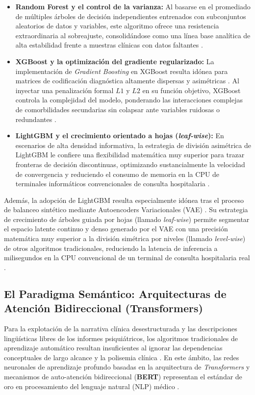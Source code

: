 \documentclass[12pt,a4paper,onecolumn,oneside]{report}
\begin{document}
\begin{itemize}
    \item \textbf{Random Forest y el control de la varianza:} Al basarse en el promediado de múltiples árboles de decisión independientes entrenados con subconjuntos aleatorios de datos y variables, este algoritmo ofrece una resistencia extraordinaria al sobreajuste, consolidándose como una línea base analítica de alta estabilidad frente a muestras clínicas con datos faltantes \cite{lai2021schizophrenia, grinsztajn2022why}.
    \item \textbf{XGBoost y la optimización del gradiente regularizado:} La implementación de \textit{Gradient Boosting} en XGBoost resulta idónea para matrices de codificación diagnóstica altamente dispersas y asimétricas \cite{lai2021schizophrenia, saboori2025predictive}. Al inyectar una penalización formal $L1$ y $L2$ en su función objetivo, XGBoost controla la complejidad del modelo, ponderando las interacciones complejas de comorbilidades secundarias sin colapsar ante variables ruidosas o redundantes \cite{grinsztajn2022why, saboori2025predictive}.
    \item \textbf{LightGBM y el crecimiento orientado a hojas (\textit{leaf-wise}):} En escenarios de alta densidad informativa, la estrategia de división asimétrica de LightGBM le confiere una flexibilidad matemática muy superior para trazar fronteras de decisión discontinuas, optimizando sustancialmente la velocidad de convergencia y reduciendo el consumo de memoria en la CPU de terminales informáticos convencionales de consulta hospitalaria \cite{grinsztajn2022why, saboori2025predictive}.
\end{itemize}

Además, la adopción de LightGBM resulta especialmente idónea tras el proceso de balanceo sintético mediante Autoencoders Variacionales (VAE) \cite{saboori2025predictive}. Su estrategia de crecimiento de árboles guiada por hojas (llamado \textit{leaf-wise}) permite segmentar el espacio latente continuo y denso generado por el VAE con una precisión matemática muy superior a la división simétrica por niveles (llamado \textit{level-wise}) de otros algoritmos tradicionales, reduciendo la latencia de inferencia a milisegundos en la CPU convencional de un terminal de consulta hospitalaria real \cite{saboori2025predictive}.

\subsection{El Paradigma Semántico: Arquitecturas de Atención Bidireccional (Transformers)}
Para la explotación de la narrativa clínica desestructurada y las descripciones lingüísticas libres de los informes psiquiátricos, los algoritmos tradicionales de aprendizaje automático resultan insuficientes al ignorar las dependencias conceptuales de largo alcance y la polisemia clínica \cite{lopez2026ia, vidal2023algoritmo}. En este ámbito, las redes neuronales de aprendizaje profundo basadas en la arquitectura de \textit{Transformers} y mecanismos de auto-atención bidireccional (\textbf{BERT}) representan el estándar de oro en procesamiento del lenguaje natural (NLP) médico \cite{canete2020beto, vidal2023algoritmo}.
\end{document}
